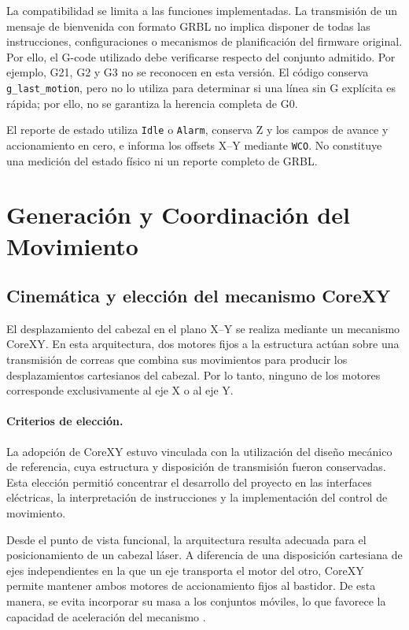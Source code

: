 \documentclass[blue,fullpaper]{ludusofficial}  %
\begin{document}
La compatibilidad se limita a las funciones implementadas.
La transmisión de un mensaje de bienvenida con formato
GRBL no implica disponer de todas las instrucciones,
configuraciones o mecanismos de planificación del
firmware original. Por ello, el G-code utilizado
debe verificarse respecto del conjunto admitido. Por ejemplo, G21, G2 y G3 no se reconocen en esta versión. El código conserva \texttt{g\_last\_motion}, pero no lo utiliza para determinar si una línea sin G explícita es rápida; por ello, no se garantiza la herencia completa de G0.

El reporte de estado utiliza \texttt{Idle} o \texttt{Alarm}, conserva Z y los campos de avance y accionamiento en cero, e informa los offsets X--Y mediante \texttt{WCO}. No constituye una medición del estado físico ni un reporte completo de GRBL.


\section{Generación y Coordinación del Movimiento}
\label{sec:movimiento}

\subsection{Cinemática y elección del mecanismo CoreXY}

El desplazamiento del cabezal en el plano X--Y
se realiza mediante un mecanismo CoreXY.
En esta arquitectura, dos motores fijos
a la estructura actúan sobre una transmisión
de correas que combina sus movimientos
para producir los desplazamientos cartesianos
del cabezal. Por lo tanto, ninguno de los
motores corresponde exclusivamente al eje X
o al eje Y.

\paragraph{Criterios de elección.}

La adopción de CoreXY estuvo vinculada
con la utilización del diseño mecánico
de referencia, cuya estructura y disposición
de transmisión fueron conservadas.
Esta elección permitió concentrar el desarrollo
del proyecto en las interfaces eléctricas,
la interpretación de instrucciones y
la implementación del control de movimiento.

Desde el punto de vista funcional,
la arquitectura resulta adecuada para
el posicionamiento de un cabezal láser.
A diferencia de una disposición cartesiana
de ejes independientes en la que un eje
transporta el motor del otro, CoreXY permite
mantener ambos motores de accionamiento
fijos al bastidor. De esta manera,
se evita incorporar su masa a los conjuntos
móviles, lo que favorece la capacidad
de aceleración del mecanismo
\cite{corexy_fundamentos}.
\end{document}

